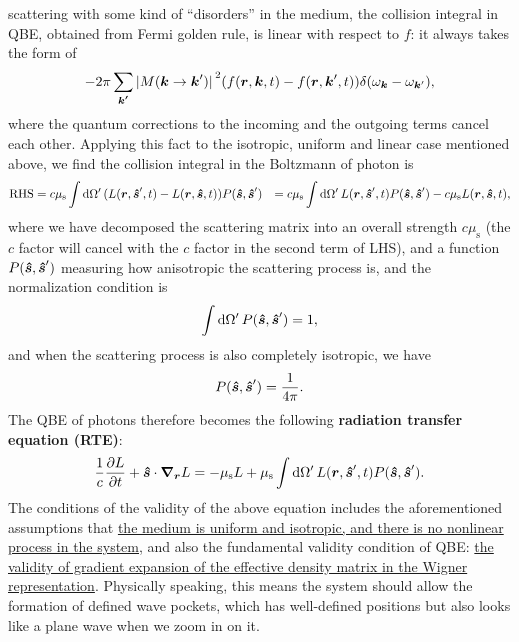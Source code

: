 \documentclass[hyperref, a4paper]{article}
\newcommand*{\concept}[1]{{\textbf{#1}}}
\def\\{}%
\begin{document}
scattering with some kind of ``disorders'' in the medium, 
the collision integral in QBE, obtained from Fermi golden rule, 
is linear with respect to $f$: 
it always takes the form of 
\[
    - 2\pi \sum_{\vb*{k'}} \abs*{M(\vb*{k} \to \vb*{k}')}^2 (f(\vb*{r}, \vb*{k} , t) - f(\vb*{r}, \vb*{k}', t) )
    \delta(\omega_{\vb*{k}} - \omega_{\vb*{k}'}),
\] 
where the quantum corrections to the incoming and the outgoing terms 
cancel each other. 
Applying this fact to the isotropic, uniform and linear case 
mentioned above, we find the collision integral in the 
Boltzmann of photon is 
\begin{equation}
    \begin{aligned}
        \text{RHS} &= c \mu_{\text{s}} \int \dd{\Omega'} (L(\vb*{r}, \vu*{s}', t) - L(\vb*{r}, \vu*{s}, t)) P(\vu*{s}, \vu*{s}') \\
        &= c \mu_{\text{s}} \int \dd{\Omega'} L(\vb*{r}, \vu*{s}', t)  P(\vu*{s}, \vu*{s}')
        - c \mu_{\text{s}} L(\vb*{r}, \vu*{s}, t) ,
    \end{aligned}
\end{equation}
where we have decomposed the scattering matrix 
into an overall strength $c \mu_{\text{s}}$ 
(the $c$ factor will cancel with the $c$ factor in the second term of LHS), 
and a function $P(\vu*{s}, \vu*{s}')$ measuring how anisotropic the scattering process is, 
and the normalization condition is 
\begin{equation}
    \int \dd{\Omega'} P(\vu*{s}, \vu*{s}') = 1,
\end{equation}
and when the scattering process is also completely isotropic, we have 
\begin{equation}
    P(\vu*{s}, \vu*{s}') = \frac{1}{4 \pi}.
\end{equation}
The QBE of photons therefore becomes the following 
\concept{radiation transfer equation (RTE)}: 
\begin{equation}
    \frac{1}{c} \pdv{L}{t} + \vu*{s} \cdot \grad_{\vb*{r}} L = 
    - \mu_{\text{s}} L + \mu_{\text{s}} \int \dd{\Omega'} 
    L(\vb*{r}, \vu*{s}', t) P(\vu*{s}, \vu*{s}').
    \label{eq:rad-transfer-1}
\end{equation}
The conditions of the validity of the above equation 
includes the aforementioned assumptions that 
\ul{the medium is uniform and isotropic, 
and there is no nonlinear process in the system,} 
and also the fundamental validity condition of QBE: 
\ul{the validity of gradient expansion of the effective density matrix 
in the Wigner representation}.
Physically speaking, this means the system should allow 
the formation of defined wave pockets, 
which has well-defined positions 
but also looks like a plane wave when we zoom in on it. 
\end{document}
